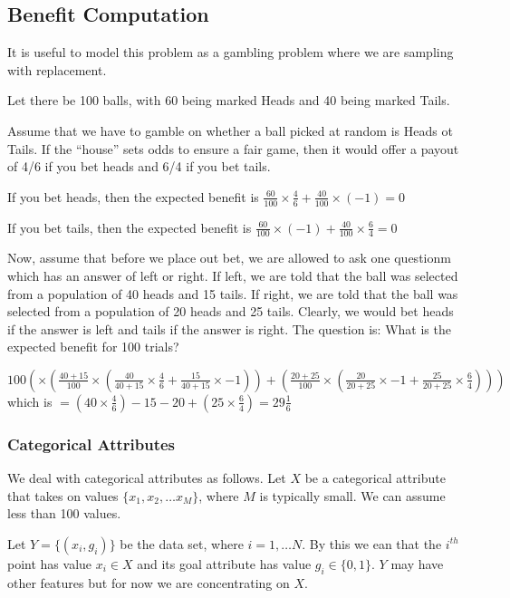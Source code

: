 \subsection{Benefit Computation}
It is useful to model this problem as a gambling problem where we are 
sampling with replacement. 
\bi
\item Let there be 100 balls, with 60  being marked Heads and 40
being marked Tails. 
\item Assume that we have to gamble on whether a ball picked at random is Heads
ot Tails. If the ``house'' sets odds to ensure a fair game, then it would offer
a payout of 4/6 if you bet heads and 6/4 if you bet tails. 
\item If you bet heads, then the expected benefit is 
\(\frac{60}{100} \times \frac{4}{6} + 
\frac{40}{100} \times (-1)  = 0\)
\item If you bet tails, then the expected benefit is 
\(\frac{60}{100} \times (-1) + 
\frac{40}{100} \times \frac{6}{4}  = 0\)
\ei

Now, assume that before we place out bet, we are allowed to ask one questionm
which has an answer of left or right. If left, we are told that the ball was
selected from a population of 40 heads and 15 tails. If right, we are told that
the ball was selected from a population of 20 heads and 25 tails. Clearly, we
would bet heads if the answer is left and tails if the answer is right. The
question is: What is the expected benefit for 100 trials?

\(100 ( \times ( \frac{40+15}{100} \times ( 
  \frac{40}{40+15} \times \frac{4}{6}  + 
  \frac{15}{40+15} \times -1 ) ) + 
  ( \frac{20+25}{100} \times ( 
  \frac{20}{20+25} \times -1 + 
  \frac{25}{20+25} \times \frac{6}{4}  ) ) )
  \)
which is \(
 = (40 \times  \frac{4}{6}) -15 - 20 + (25 \times \frac{6}{4} )
 = 29 \frac{1}{6}\)

\subsubsection{Categorical Attributes}
We deal with categorical attributes as follows. Let \(X\) be a categorical
attribute that takes on values \(\{x_1, x_2, \ldots x_M\}\), where \(M\) is
typically small. We can assume less than 100 values.

Let \(Y = \{(x_i, g_i)\}\) be the data set, where \(i = 1, \ldots N\). 
By this we ean
that the \(i^{th}\) point has value \(x_i \in X\) and its goal attribute has
value \(g_i \in \{0, 1\}\). 
\(Y\) may have other features but for now we are concentrating on \(X\).

